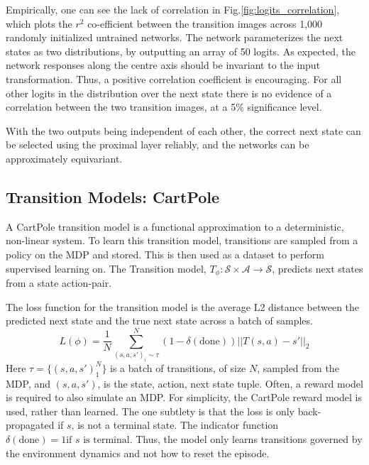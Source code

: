 Empirically, one can see the lack of correlation in Fig.\ref{fig:logits_correlation}, which plots the $r^2$ co-efficient between the transition images across 1,000 randomly initialized untrained networks. The network parameterizes the next states as two distributions, by outputting an array of 50 logits. As expected, the network responses along the centre axis should be invariant to the input transformation. Thus, a positive correlation coefficient is encouraging. For all other logits in the distribution over the next state there is no evidence of a correlation between the two transition images, at a 5\% significance level.

With the two outputs being independent of each other, the correct next state can be selected using the proximal layer reliably, and the networks can be approximately equivariant.



\subsection{Transition Models: CartPole}
A CartPole transition model is a functional approximation to a deterministic, non-linear system.
To learn this transition model, transitions are sampled from a policy on the MDP and stored. This is then used as a dataset to perform supervised learning on. The Transition model, $T_\phi: \mathcal{S} \times \mathcal{A} \rightarrow \mathcal{S}$, predicts next states from a state action-pair.

The loss function for the transition model is the average L2 distance between the predicted next state and the true next state across a batch of samples.
\begin{equation}
	L(\phi) = \frac{1}{N}\sum^N_{(s, a, s')_i \sim \mathcal \tau} (1-\delta(\text{done}))||T(s, a) - s'||_2
\end{equation}
Here $\tau = \{(s, a , s')_1^N\}$ is a batch of transitions, of size $N$, sampled from the MDP, and $(s, a, s')$, is the state, action, next state tuple. Often, a reward model is required to also simulate an MDP. For simplicity, the CartPole reward model is used, rather than learned. The one subtlety is that the loss is only back-propagated if $s$, is not a terminal state. The indicator function $\delta(\text{done}) = 1 \text{if $s$ is terminal} $. Thus, the model only learns transitions governed by the environment dynamics and not how to reset the episode.


